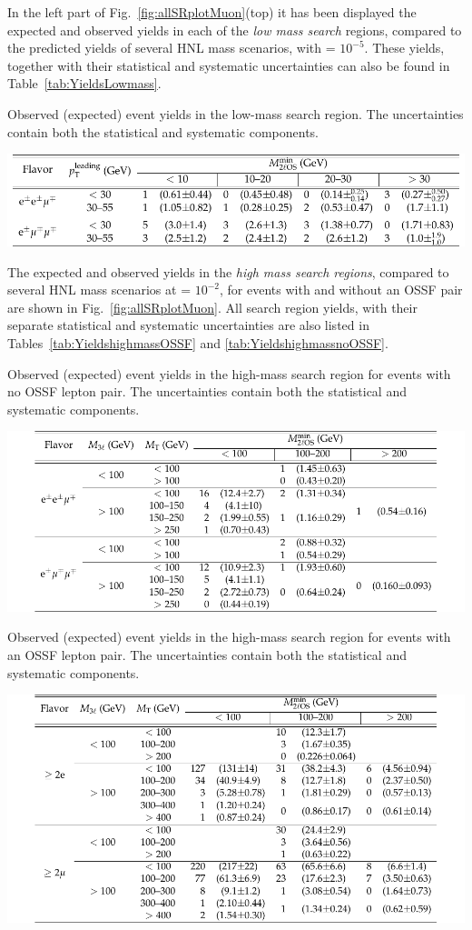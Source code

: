 In the left part of Fig.~\ref{fig:allSRplotMuon}(top) it has been displayed 
the expected and observed yields in each of the \emph{low mass search}
regions, compared to the predicted yields of several HNL mass
scenarios, with \mixpar = $10^{-5}$. These yields, together with their
statistical and systematic uncertainties can also be found in
Table~\ref{tab:YieldsLowmass}. 
\begin{table}[h]
\centering
\caption{Observed (expected) event yields in the low-mass search region. The uncertainties
contain both the statistical and systematic components. }
\label{tab:YieldsLowmass}
\includegraphics[width=0.7\linewidth]{Figures/c5/tables/CMS-EXO-17-012_Table_0A1.pdf}
\end{table}

The expected and observed yields in the \emph{high mass search regions},
compared to several HNL mass scenarios at \mixpar = $10^{-2}$, for
events with and without an OSSF pair are shown in Fig.~\ref{fig:allSRplotMuon}. All search region yields, with their separate statistical and systematic uncertainties are also listed in Tables~\ref{tab:YieldshighmassOSSF} and \ref{tab:YieldshighmassnoOSSF}. 
\begin{table}[h]
\centering
\caption{Observed (expected) event yields in the high-mass search region for events with no
OSSF lepton pair. The uncertainties contain both the statistical and systematic components.}
\label{tab:YieldshighmassOSSF}
\includegraphics[width=0.75\linewidth]{Figures/c5/tables/CMS-EXO-17-012_Table_0A2.pdf}
\end{table}

\begin{table}[tbh]
\centering
\caption{Observed (expected) event yields in the high-mass search region for events with an
OSSF lepton pair. The uncertainties contain both the statistical and systematic components.}
\label{tab:YieldshighmassnoOSSF}
\includegraphics[width=0.75\linewidth]{Figures/c5/tables/CMS-EXO-17-012_Table_0A3.pdf}
\end{table}

